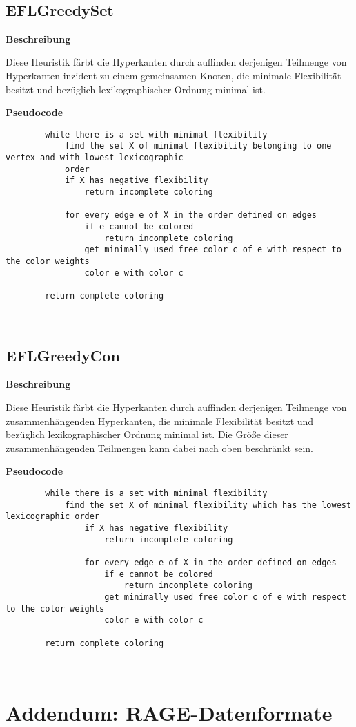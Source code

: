 \documentclass{article}
\begin{document}
	~\newline
	~\newline
	
	\subsection{EFLGreedySet}
	
	\textbf{Beschreibung}
	
	Diese Heuristik färbt die Hyperkanten durch auffinden derjenigen Teilmenge von Hyperkanten inzident zu einem gemeinsamen Knoten, die minimale Flexibilität besitzt und bezüglich lexikographischer Ordnung minimal ist.
	
	\textbf{Pseudocode}
	\begin{verbatim}  
		while there is a set with minimal flexibility
		    find the set X of minimal flexibility belonging to one vertex and with lowest lexicographic 
		    order
		    if X has negative flexibility
		        return incomplete coloring
		        
		    for every edge e of X in the order defined on edges
		        if e cannot be colored
		            return incomplete coloring
		        get minimally used free color c of e with respect to the color weights
		        color e with color c
				        
		return complete coloring
	\end{verbatim}
	
	~\newpage
	
	\subsection{EFLGreedyCon}
	
	\textbf{Beschreibung}
	
	Diese Heuristik färbt die Hyperkanten durch auffinden derjenigen Teilmenge von zusammenhängenden Hyperkanten, die minimale Flexibilität besitzt und bezüglich lexikographischer Ordnung minimal ist. Die Größe dieser zusammenhängenden Teilmengen kann dabei nach oben beschränkt sein.
	
	\textbf{Pseudocode}
	\begin{verbatim}    
		while there is a set with minimal flexibility
		    find the set X of minimal flexibility which has the lowest lexicographic order
		        if X has negative flexibility
		            return incomplete coloring
		            
		        for every edge e of X in the order defined on edges
		            if e cannot be colored
		                return incomplete coloring
		            get minimally used free color c of e with respect to the color weights
		            color e with color c
				        
		return complete coloring
	\end{verbatim}	
	
	
	
	~\newpage
	\section{Addendum: RAGE-Datenformate}
	
\end{document}
